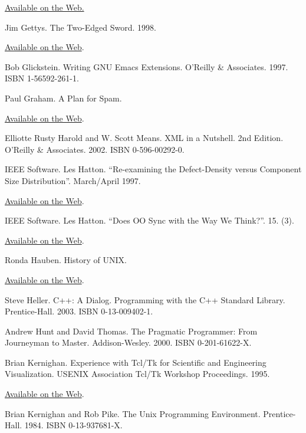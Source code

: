 \documentclass[12pt,oneside]{book}
\begin{document}
\begin{common-format}
\begin{thebibliography}{9}
\href{http://www.acm.org/cacm/AUG96/antimac.htm}{Available on the Web.}

 Jim Gettys. The Two-Edged Sword. 1998.

\href{http://freshmeat.net/articles/view/122/}{Available on the Web}.

 Bob Glickstein. Writing GNU Emacs Extensions. O'Reilly \&{} Associates. 1997. ISBN 1-56592-261-1.

 Paul Graham. A Plan for Spam.

\href{http://www.paulgraham.com/spam.html}{Available on the Web}.

 Elliotte Rusty Harold and W. Scott Means. XML in a Nutshell. 2nd Edition. O'Reilly \&{} Associates. 2002. ISBN 0-596-00292-0.

 IEEE Software. Les Hatton. “Re-examining the Defect-Density versus Component Size Distribution”. March/April 1997.

\href{http://www.cs.ukc.ac.uk/people/staff/lh8/pubs/pubis697/Ubend_IS697.pdf.gz}{Available on the Web}.

 IEEE Software. Les Hatton. “Does OO Sync with the Way We Think?”. 15. (3).

\href{http://www.cs.ukc.ac.uk/people/staff/lh8/pubs/pubis698/OO_IS698.pdf.gz}{Available on the Web}.

 Ronda Hauben. History of UNIX.

\href{http://www.dei.isep.ipp.pt/docs/unix.html}{Available on the Web}.

 Steve Heller. C++: A Dialog. Programming with the C++ Standard Library. Prentice-Hall. 2003. ISBN 0-13-009402-1.

 Andrew Hunt and David Thomas. The Pragmatic Programmer: From Journeyman to Master. Addison-Wesley. 2000. ISBN 0-201-61622-X.

 Brian Kernighan. Experience with Tcl/Tk for Scientific and Engineering Visualization. USENIX Association Tcl/Tk Workshop Proceedings. 1995.

\href{http://www.usenix.org/publications/library/proceedings/tcl95/full_papers/kernighan.txt}{Available on the Web}.

 Brian Kernighan and Rob Pike. The Unix Programming Environment. Prentice-Hall. 1984. ISBN 0-13-937681-X.


\end{thebibliography}
\end{common-format}
\end{document}
